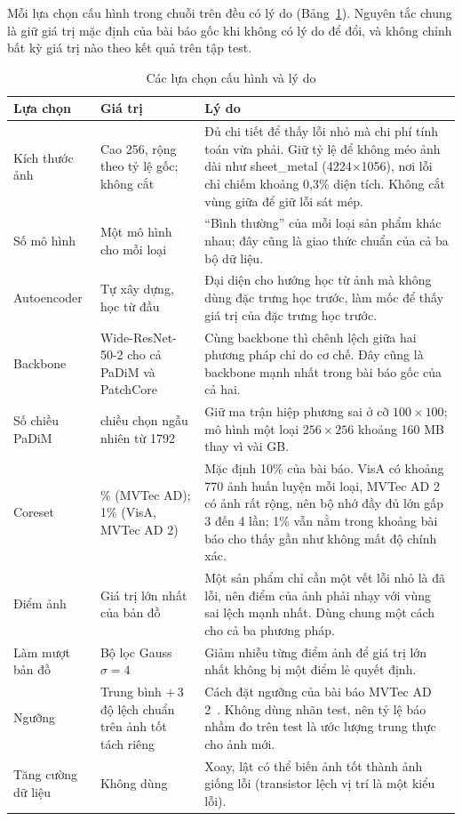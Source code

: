 Mỗi lựa chọn cấu hình trong chuỗi trên đều có lý do (Bảng~\ref{tab:lua-chon}). Nguyên tắc chung là giữ giá trị
mặc định của bài báo gốc khi không có lý do để đổi, và không chỉnh bất kỳ giá trị nào theo kết quả trên tập test.

\begin{table}[htbp]
  \centering
  \caption{Các lựa chọn cấu hình và lý do}
  \label{tab:lua-chon}
  \small
  \begin{tabular}{@{}>{\raggedright\arraybackslash}p{3.3cm} >{\raggedright\arraybackslash}p{3.6cm} >{\raggedright\arraybackslash}p{7.6cm}@{}}
    \toprule
    Lựa chọn & Giá trị & Lý do \\
    \midrule
    Kích thước ảnh & Cao 256, rộng theo tỷ lệ gốc; không cắt & Đủ chi tiết để thấy lỗi nhỏ mà chi phí tính toán vừa
      phải. Giữ tỷ lệ để không méo ảnh dài như sheet\_metal (4224×1056), nơi lỗi chỉ chiếm khoảng 0,3\% diện tích.
      Không cắt vùng giữa để giữ lỗi sát mép. \\
    Số mô hình & Một mô hình cho mỗi loại & ``Bình thường'' của mỗi loại sản phẩm khác nhau; đây cũng là giao thức
      chuẩn của cả ba bộ dữ liệu. \\
    Autoencoder & Tự xây dựng, học từ đầu & Đại diện cho hướng học từ ảnh mà không dùng đặc trưng học trước, làm
      mốc để thấy giá trị của đặc trưng học trước. \\
    Backbone & Wide-ResNet-50-2 cho cả PaDiM và PatchCore & Cùng backbone thì chênh lệch giữa hai phương pháp chỉ do
      cơ chế. Đây cũng là backbone mạnh nhất trong bài báo gốc của cả hai. \\
    Số chiều PaDiM & 100 chiều chọn ngẫu nhiên từ 1792 & Giữ ma trận hiệp phương sai ở cỡ $100\times100$; mô hình
      một loại $256\times256$ khoảng 160 MB thay vì vài GB. \\
    Coreset & 10\% (MVTec AD); 1\% (VisA, MVTec AD 2) & Mặc định 10\% của bài báo. VisA có khoảng 770 ảnh huấn luyện
      mỗi loại, MVTec AD 2 có ảnh rất rộng, nên bộ nhớ đầy đủ lớn gấp 3 đến 4 lần; 1\% vẫn nằm trong khoảng bài báo
      cho thấy gần như không mất độ chính xác. \\
    Điểm ảnh & Giá trị lớn nhất của bản đồ & Một sản phẩm chỉ cần một vết lỗi nhỏ là đã lỗi, nên điểm của ảnh phải
      nhạy với vùng sai lệch mạnh nhất. Dùng chung một cách cho cả ba phương pháp. \\
    Làm mượt bản đồ & Bộ lọc Gauss $\sigma=4$ & Giảm nhiễu từng điểm ảnh để giá trị lớn nhất không bị một điểm lẻ
      quyết định. \\
    Ngưỡng & Trung bình $+\,3$ độ lệch chuẩn trên ảnh tốt tách riêng & Cách đặt ngưỡng của bài báo MVTec AD
      2~\cite{hecklerkramMVTecAD2Dataset2026}. Không dùng nhãn test, nên tỷ lệ báo nhầm đo trên test là ước lượng
      trung thực cho ảnh mới. \\
    Tăng cường dữ liệu & Không dùng & Xoay, lật có thể biến ảnh tốt thành ảnh giống lỗi (transistor lệch vị trí là
      một kiểu lỗi). \\
    \bottomrule
  \end{tabular}
\end{table}

